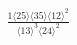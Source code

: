 \documentclass[varwidth, border=5pt]{standalone}
\begin{document}
\begin{my}
$\begin{gathered}
\scriptscriptstyle\frac{1⟨25⟩⟨35⟩⟨12⟩^2}{⟨13⟩^3⟨24⟩^2}
\end{gathered}$
\end{my}
\end{document}
